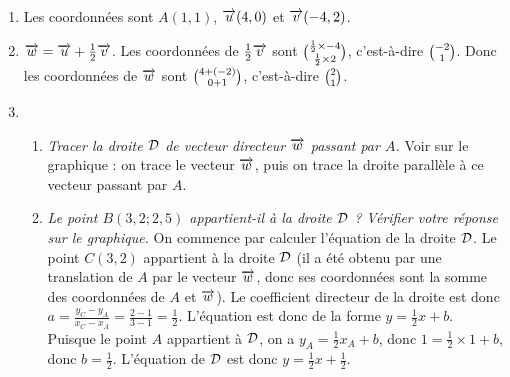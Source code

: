 \documentclass[11pt]{article}
\begin{document}
\begin{exercice}~

  \begin{center}
  \end{center}

  \begin{enumerate}
    \item Les coordonnées sont $A(1,1)$, $\overrightarrow{u}(4,0)$ et $\overrightarrow{v}(-4,2)$.
    \item $\overrightarrow{w}=\overrightarrow{u} +\frac{1}{2}\overrightarrow{v}$. Les coordonnées de $\frac{1}{2}\overrightarrow{v}$ sont $\binom{\frac{1}{2}\times-4}{\frac{1}{2}\times2}$, c'est-à-dire $\binom{-2}{1}$. Donc les coordonnées de $\overrightarrow{w}$ sont $\binom{4+(-2)}{0+1}$, c'est-à-dire $\binom{2}{1}$.
    \item \begin{enumerate}
        \item \emph{Tracer la droite $\cal D$ de vecteur directeur $\overrightarrow{w}$ passant par $A$.} Voir sur le graphique : on trace le vecteur $\overrightarrow{w}$, puis on trace la droite \og{} parallèle \fg{} à ce vecteur passant par $A$.
        \item \emph{Le point $B(3,2;2,5)$ appartient-il à la droite $\cal D$ ?}
          \emph{Vérifier votre réponse sur le graphique.} On commence par calculer l'équation de la droite $\cal D$. Le point $C(3,2)$ appartient à la droite $\cal D$ (il a été obtenu par une translation de $A$ par le vecteur $\overrightarrow{w}$, donc ses coordonnées sont la somme des coordonnées de $A$ et $\overrightarrow{w}$). Le coefficient directeur de la droite est donc $a=\frac{y_C-y_A}{x_C-x_A}=\frac{2-1}{3-1}=\frac{1}{2}$. L'équation est donc de la forme $y=\frac{1}{2}x+b$. Puisque le point $A$ appartient à $\cal D$, on a $y_A=\frac{1}{2}x_A+b$, donc $1=\frac{1}{2}\times1+b$, donc $b=\frac{1}{2}$. L'équation de $\cal D$ est donc $y=\frac12x+\frac12$.


\end{enumerate}
\end{enumerate}
\end{exercice}
\end{document}
